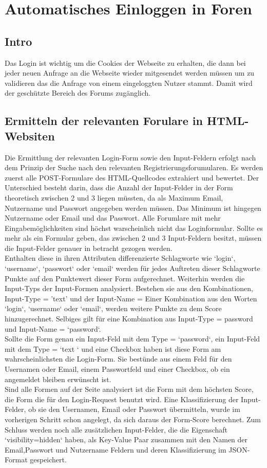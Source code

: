 \section {Automatisches Einloggen in Foren}
\subsection{Intro}
 Das Login ist wichtig um die Cookies der Webseite zu erhalten, die dann bei jeder neuen Anfrage an die Webseite wieder mitgesendet werden müssen um zu validieren das die Anfrage von einem eingeloggten Nutzer stammt. Damit wird der geschützte Bereich des Forums zugänglich.
\subsection{Ermitteln der relevanten Forulare in HTML-Websiten}
Die Ermittlung der relevanten Login-Form sowie den Input-Feldern erfolgt nach dem Prinzip der Suche nach den relevanten Registrierungsforumularen. Es werden zuerst alle POST-Formulare des HTML-Quellcodes extrahiert und bewertet. Der Unterschied besteht darin, dass die Anzahl der Input-Felder in der Form theoretisch zwischen 2 und 3 liegen müssten, da als Maximum Email, Nutzername und Passwort angegeben werden müssen. Das Minimum ist hingegen Nutzername oder Email und das Passwort. Alle Forumlare mit mehr Eingabemöglichkeiten sind höchst warscheinlich nicht das Loginformular.
Sollte es mehr als ein Formular geben, das zwischen 2 und 3 Input-Feldern besitzt, müssen die Input-Felder genauer in betracht gezogen werden. \\
Enthalten diese in ihren Attributen differenzierte Schlagworte wie `login`, `username`, `passwort` oder `email` werden für jedes Auftreten dieser Schlagworte Punkte auf den Punktewert dieser Form aufgerechnet. Weiterhin werden die Input-Typs der Input-Formen analysiert. Bestehen sie aus den Kombinationen, Input-Type = 'text' und der Input-Name = Einer Kombination aus den Worten  `login`, `username` oder `email`, werden weitere Punkte zu dem Score hinzugerechnet. Selbiges gilt für eine Kombination aus Input-Type = password und Input-Name = `password`.\\
Sollte die Form genau ein Input-Feld mit dem Type = `password`, ein Input-Feld mit dem Type = `text ` und eine Checkbox haben ist diese Form am wahrscheinlichsten die Login-Form. Sie bestünde aus einem Feld für den Usernamen oder Email, einem Passwortfeld und einer Checkbox, ob ein angemeldet bleiben erwünscht ist.\\
Sind alle Formen auf der Seite analysiert ist die Form mit dem höchsten Score, die Form die für den Login-Request benutzt wird. Eine Klassifizierung der Input-Felder, ob sie den Usernamen, Email oder Passwort übermitteln, wurde im vorherigen Schritt schon angelegt, da sich daraus der Form-Score berechnet. Zum Schluss werden noch alle zusätzlichen Input-Felder, die die Eigenschaft `visibility=hidden` haben, als Key-Value Paar zusammen mit den Namen der Email,Passwort und Nutzername Feldern und deren Klassifizierung im JSON-Format gespeichert.
